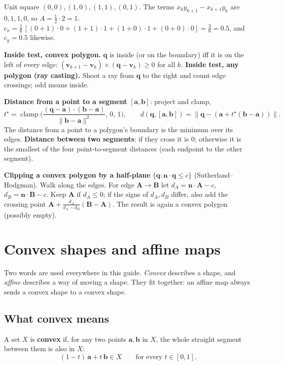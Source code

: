 \documentclass[11pt,a4paper]{article}
\newcommand{\vect}[1]{\mathbf{#1}}
\begin{document}
\begin{examplebox}
Unit square $(0,0),(1,0),(1,1),(0,1)$. The terms $x_ky_{k+1}-x_{k+1}y_k$ are $0,1,1,0$, so $A=\tfrac12\cdot2=1$.
$c_x=\tfrac16\,[(0+1)\cdot0+(1+1)\cdot1+(1+0)\cdot1+(0+0)\cdot0]=\tfrac36=0.5$, and $c_y=0.5$ likewise.
\end{examplebox}

\textbf{Inside test, convex polygon.} $\vect{q}$ is inside (or on the boundary) iff it is on the left of every edge:
$(\vect{v}_{k+1}-\vect{v}_k)\times(\vect{q}-\vect{v}_k)\ge0$ for all $k$.
\textbf{Inside test, any polygon (ray casting).} Shoot a ray from $\vect{q}$ to the right and count edge crossings;
odd means inside.

\textbf{Distance from a point to a segment} $[\vect{a},\vect{b}]$: project and clamp,
\[
t^\star=\operatorname{clamp}\!\Big(\frac{(\vect{q}-\vect{a})\cdot(\vect{b}-\vect{a})}{\|\vect{b}-\vect{a}\|^2},\,0,\,1\Big),
\qquad d(\vect{q},[\vect{a},\vect{b}])=\big\|\vect{q}-(\vect{a}+t^\star(\vect{b}-\vect{a}))\big\|.
\]
The distance from a point to a polygon's boundary is the minimum over its edges. \textbf{Distance between two
segments}: if they cross it is $0$; otherwise it is the smallest of the four point-to-segment distances (each
endpoint to the other segment).

\textbf{Clipping a convex polygon by a half-plane} $\{\vect{q}:\vect{n}\cdot\vect{q}\le c\}$ (Sutherland--Hodgman).
Walk along the edges. For edge $\vect{A}\to\vect{B}$ let $d_A=\vect{n}\cdot\vect{A}-c$, $d_B=\vect{n}\cdot\vect{B}-c$.
Keep $\vect{A}$ if $d_A\le0$; if the signs of $d_A,d_B$ differ, also add the crossing point
$\vect{A}+\frac{d_A}{d_A-d_B}(\vect{B}-\vect{A})$. The result is again a convex polygon (possibly empty).

\section{Convex shapes and affine maps}\label{sec:convaff}

Two words are used everywhere in this guide. \emph{Convex} describes a shape, and \emph{affine} describes a way of
moving a shape. They fit together: an affine map always sends a convex shape to a convex shape.

\subsection{What convex means}
A set $X$ is \textbf{convex} if, for any two points $\vect{a},\vect{b}$ in $X$, the whole straight segment between them
is also in $X$:
\[
(1-t)\,\vect{a}+t\,\vect{b}\in X\qquad\text{for every } t\in[0,1].
\]
\end{document}
